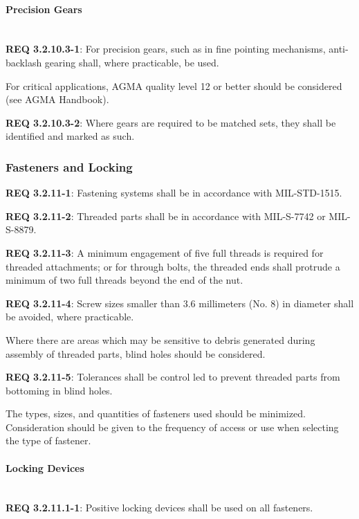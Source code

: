 \documentclass[12pt]{article}
\begin{document}
\paragraph{Precision Gears} \mbox{} \\ %
\noindent \textbf{REQ 3.2.10.3-1}: For precision gears, such as in fine pointing mechanisms, anti-backlash gearing shall, where practicable, be used.

For critical applications, AGMA quality level 12 or better should be considered (see AGMA Handbook).

\noindent \textbf{REQ 3.2.10.3-2}: Where gears are required to be matched sets, they shall be identified and marked as such.


\clearpage
\subsubsection{Fasteners and Locking} %

\noindent \textbf{REQ 3.2.11-1}: Fastening systems shall be in accordance with MIL-STD-1515.

\noindent \textbf{REQ 3.2.11-2}: Threaded parts shall be in accordance with MIL-S-7742 or MIL-S-8879. 

\noindent \textbf{REQ 3.2.11-3}: A minimum engagement of five full threads is required for threaded attachments; or for through bolts, the threaded ends shall protrude a minimum of two full threads beyond the end of the nut. 

\noindent \textbf{REQ 3.2.11-4}: Screw sizes smaller than 3.6 millimeters (No. 8) in diameter shall be avoided, where practicable. 

Where there are areas which may be sensitive to debris generated during assembly of threaded parts, blind holes should be considered. 

\noindent \textbf{REQ 3.2.11-5}: Tolerances shall be control led to prevent threaded parts from bottoming in blind holes. 

The types, sizes, and quantities of fasteners used should be minimized.
Consideration should be given to the frequency of access or use when selecting the type of fastener.


\paragraph{Locking Devices} \mbox{} \\ %
\noindent \textbf{REQ 3.2.11.1-1}: Positive locking devices shall be used on all fasteners. 
\end{document}
